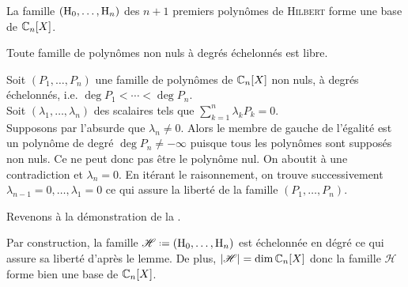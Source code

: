 \begin{prop} 
    La famille $(\mathrm{H}_0, \dots, \mathrm{H}_n)$ des $n+1$ premiers polynômes de \textsc{Hilbert} forme une base de $\mathbb{C}_n[X]$.
\end{prop}

\begin{lemme} 
    Toute famille de polynômes non nuls à degrés échelonnés est libre.
\end{lemme}

\begin{preuve}
    Soit $(P_1, \dots, P_n)$ une famille de polynômes de $\mathbb{C}_n[X]$ non nuls, à degrés échelonnés, i.e. $\deg P_1 < \cdots < \deg P_n$. \\
    Soit $(\lambda_1, \dots, \lambda_n)$ des scalaires tels que  $\sum\limits_{k=1}^n \lambda_k P_k = 0$. \\
    Supposons par l'absurde que $\lambda_n \not= 0$. Alors le membre de gauche de l'égalité est un polynôme de degré $\deg P_n \not= - \infty$ puisque tous les polynômes sont supposés non nuls. Ce ne peut donc pas être le polynôme nul. On aboutit à une contradiction et $\lambda_n = 0$. En itérant le raisonnement, on trouve successivement $\lambda_{n-1} = 0, \dots, \lambda_1 = 0$ ce qui assure la liberté de la famille $(P_1, \dots, P_n)$.
\end{preuve}

Revenons à la démonstration de la .

\begin{preuve}
    Par construction, la famille $\mathscr{H} \defeq (\Hilb_0, \dots, \Hilb_n)$ est échelonnée en dégré \note ce qui assure sa liberté d'après le lemme. De plus, $|\mathscr{H}| = \dim \mathbb{C}_n[X]$ donc la famille $\mathscr{H}$ forme bien une base de $\mathbb{C}_n[X]$.
\end{preuve}